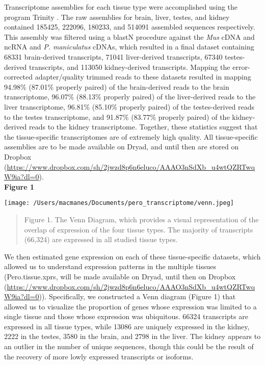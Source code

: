 \documentclass[12pt]{article}
\begin{document}
Transcriptome assemblies for each tissue type were accomplished using the program Trinity \citep{Haas:2013jq}. The raw assemblies for brain, liver, testes, and kidney contained 185425, 222096, 180233, and 514091 assembled sequences respectively. This assembly was filtered using a blastN procedure against the \textit{Mus} cDNA and ncRNA and \textit{P. maniculatus} cDNAs, which resulted in a final dataset containing 68331 brain-derived transcripts, 71041 liver-derived transcripts, 67340 testes-derived transcripts, and 113050 kidney-derived transcripts. Mapping the error-corrected adapter/quality trimmed reads to these datasets resulted in mapping 94.98\% (87.01\% properly paired) of the brain-derived reads to the brain transcriptome, 96.07\% (88.13\% properly paired) of the liver-derived reads to the liver transcriptome, 96.81\% (85.10\% properly paired) of the testes-derived reads to the testes transcriptome, and 91.87\% (83.77\% properly paired) of the kidney-derived reads to the kidney transcriptome. Together, these statistics suggest that the tissue-specific transcriptomes are of extremely high quality. All tissue-specific assemblies are to be made available on Dryad, and until then are stored on Dropbox (\url{https://www.dropbox.com/sh/2jwzd8p6n6eluco/AAAO3nSdXb_u4wtQZRTwqW9ia?dl=0}). \\

\textbf{\hypertarget{Figure 1}{Figure 1}} \\
\centerline{\texttt{[image: /Users/macmanes/Documents/pero\_transcriptome/venn.jpeg]}}
\begin{quote}
\small{Figure 1. The Venn Diagram, which provides a visual representation of the overlap of expression of the four tissue types. The majority of transcripts (66,324) are expressed in all studied tissue types.}
\end{quote}   

We then estimated gene expression on each of these tissue-specific datasets, which allowed us to understand expression patterns in the multiple tissues (Pero.tissue.xprs, will be made available on Dryad, until then on Dropbox (\url{https://www.dropbox.com/sh/2jwzd8p6n6eluco/AAAO3nSdXb_u4wtQZRTwqW9ia?dl=0})). Specifically, we constructed a Venn diagram ({\hypertarget{Figure 1}{Figure 1}}) that allowed us to visualize the proportion of genes whose expression was limited to a single tissue and those whose expression was ubiquitous. 66324 transcripts are expressed in all tissue types, while 13086 are uniquely expressed in the kidney, 2222 in the testes, 3580 in the brain, and 2798 in the liver. The kidney appears to an outlier in the number of unique sequences, though this could be the result of the recovery of more lowly expressed transcripts or isoforms.  \\
\end{document}
